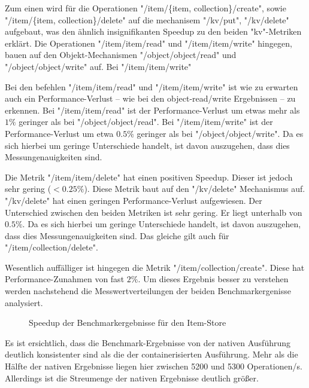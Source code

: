 Zum einen wird für die Operationen "/item/\{item, collection\}/create", sowie "/item/\{item, collection\}/delete" auf die mechanisem "/kv/put", "/kv/delete" aufgebaut, was den ähnlich insignifikanten Speedup zu den beiden "kv"-Metriken erklärt. 
Die Operationen "/item/item/read" und "/item/item/write" hingegen, bauen auf den Objekt-Mechanismen "/object/object/read" und "/object/object/write" auf. Bei "/item/item/write"

Bei den befehlen "/item/item/read" und "/item/item/write" ist wie zu erwarten auch ein Performance-Verlust – wie bei den object-read/write Ergebnissen – zu erkennen. Bei "/item/item/read" ist der Performance-Verlust um etwas mehr als $1\%$ geringer als bei "/object/object/read". Bei "/item/item/write" ist der Performance-Verlust um etwa $0.5\%$ geringer als bei "/object/object/write". Da es sich hierbei um geringe Unterschiede handelt, ist davon auszugehen, dass dies Messungenauigkeiten sind. 

Die Metrik "/item/item/delete" hat einen positiven Speedup. Dieser ist jedoch sehr gering ($<0.25\%$). Diese Metrik baut auf den "/kv/delete" Mechanismus auf. "/kv/delete" hat einen geringen Performance-Verlust aufgewiesen. Der Unterschied zwischen den beiden Metriken ist sehr gering. Er liegt unterhalb von $0.5\%$. Da es sich hierbei um geringe Unterschiede handelt, ist davon auszugehen, dass dies Messungenauigkeiten sind. Das gleiche gilt auch für "/item/collection/delete".

Wesentlich auffälliger ist hingegen die Metrik "/item/collection/create". Diese hat Performance-Zunahmen von fast $2\%$. Um dieses Ergebnis besser zu verstehen werden nachstehend die Messwertverteilungen der beiden Benchmarkergenisse analysiert. 

\begin{figure}
    \centering
    
    \caption{Speedup der Benchmarkergebnisse für den Item-Store}
    \label{fig:speedup_item_collection_create}
\end{figure}

\FloatBarrier

Es ist ersichtlich, dass die Benchmark-Ergebnisse von der nativen Ausführung deutlich konsistenter sind als die der containerisierten Ausführung. Mehr als die Hälfte der nativen Ergebnisse liegen hier zwischen 5200 und 5300 Operationen/s. Allerdings ist die Streumenge der nativen Ergebnisse deutlich größer. 

